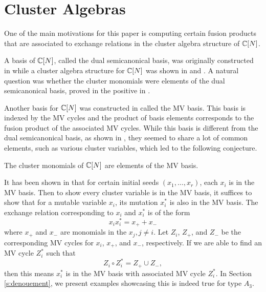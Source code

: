 \documentclass[draft]{article}
\begin{document}
% 
\section{Cluster Algebras}
One of the main motivations for this paper is computing certain fusion products that are associated to exchange relations in the cluster algebra structure of $\mathbb C[N]$. 

A basis of $\mathbb C[N]$, called the dual semicanonical basis, was originally constructed in \cite{lusztig2000semicanonical} while a cluster algebra structure for $\mathbb C[N]$ was shown in \cite{berenstein2005cluster3} and \cite{geiss2007initial}.
A natural question was whether the cluster monomials were elements of the dual semicanonical basis, proved in the positive in \cite{geiss2006rigid}.

Another basis for $\mathbb C[N]$ was constructed in \cite{mirkovic2007geometric} called the MV basis. This basis is indexed by the MV cycles and the product of basis elements corresponds to the fusion product of the associated MV cycles. While this basis is different from the dual semicanonical basis, as shown in \cite{baumann2019mirkovic}, they seemed to share a lot of common elements, such as various cluster variables, which led to the following conjecture.

\begin{conjecture}
    The cluster monomials of $\mathbb C[N]$ are elements of the MV basis.
\end{conjecture}

It has been shown in \cite{kato2011polytopal} that for certain initial seeds $(x_1, \dots, x_r)$, each $x_i$ is in the MV basis. Then to show every cluster variable is in the MV basis, it suffices to show that for a mutable variable $x_i$, its mutation $x_i^*$ is also in the MV basis. The exchange relation corresponding to $x_i$ and $x_i^*$ is of the form
$$x_ix_i^* = x_+ + x_-$$
where $x_+$ and $x_-$ are monomials in the $x_j,j\neq i$. Let $Z_i$, $Z_+$, and $Z_-$ be the corresponding MV cycles for $x_i$, $x_+$, and $x_-$, respectively. If we are able to find an MV cycle $Z_i^*$ such that
$$Z_i \circ Z_i^* = Z_+ \cup Z_-,$$
then this means $x_i^*$ is in the MV basis with associated MV cycle $Z_i^*$. In Section \ref{s:denouement}, we present examples showcasing this is indeed true for type $A_3$. 
\end{document}
